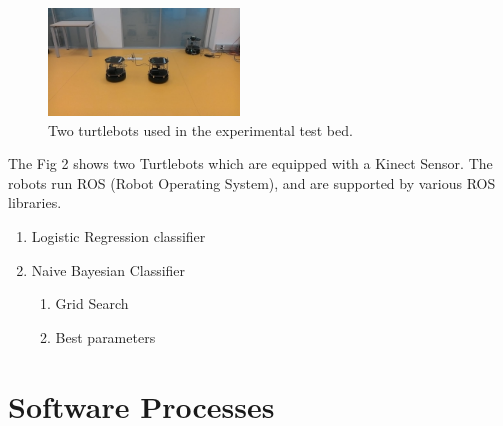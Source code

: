 \documentclass[journal]{IEEEtran}
\begin{document}
\begin{figure}[!h]
\begin{center}
\includegraphics[width=2in]{two.jpg}
\caption{Two turtlebots used in the experimental test bed.}
\end{center}
\label{fig:mypicture2}
\end{figure}
The Fig 2 shows two Turtlebots which are equipped with a Kinect Sensor. The robots run ROS (Robot Operating System), and are supported by various ROS libraries. 


\begin{enumerate}

\item Logistic Regression classifier
\item Naive Bayesian Classifier


\begin{enumerate}
\item Grid Search
\item Best parameters
\end{enumerate}



\end{enumerate}






\section{Software Processes}
\end{document}
